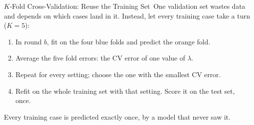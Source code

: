\documentclass[aspectratio=169,11pt,xcolor=dvipsnames]{beamer}
\newcommand{\srcp}[1]{{\scriptsize\color{gray}(#1)}}
\newcommand{\core}{\,\raisebox{0.6pt}{\textcolor{corestar}{$\bigstar$}}}
\begin{document}
\begin{frame}{$K$-Fold Cross-Validation: Reuse the Training Set\core}
One validation set wastes data and depends on which cases land in it. Instead, let every
training case take a turn \srcp{$K = 5$}:
\vskip4pt
\begin{center}
\end{center}
\vskip2pt
\begin{enumerate}\itemsep2pt\small
  \item In round $b$, fit on the four blue folds and predict the orange fold.
  \item Average the five fold errors: the CV error of one value of $\lambda$.
  \item Repeat for every setting; choose the one with the smallest CV error.
  \item Refit on the whole training set with that setting. Score it on the test set, once.
\end{enumerate}
{\small Every training case is predicted exactly once, by a model that never saw it.}
\end{frame}
\end{document}
